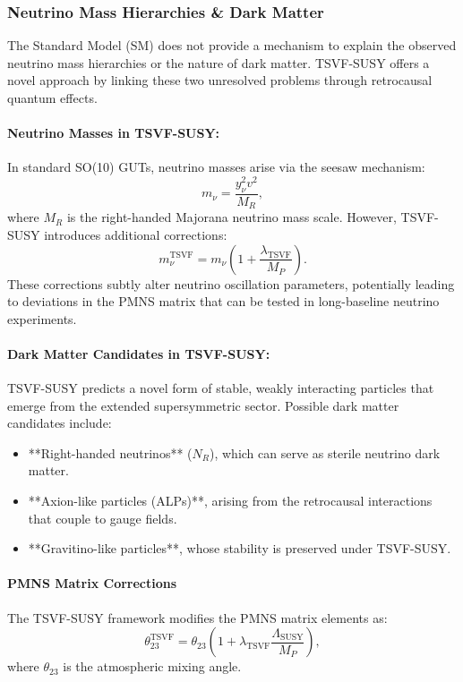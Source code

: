 \documentclass[twocolumn,superscriptaddress,floatfix]{revtex4-2}
\begin{document}
\subsubsection{Neutrino Mass Hierarchies \& Dark Matter}
\label{subsec:neutrino_darkmatter}

The Standard Model (SM) does not provide a mechanism to explain the observed neutrino mass hierarchies or the nature of dark matter. TSVF-SUSY offers a novel approach by linking these two unresolved problems through retrocausal quantum effects.

\paragraph{Neutrino Masses in TSVF-SUSY:}  
In standard SO(10) GUTs, neutrino masses arise via the seesaw mechanism:
\begin{equation}
m_{\nu} = \frac{y_{\nu}^2 v^2}{M_R},
\end{equation}
where $M_R$ is the right-handed Majorana neutrino mass scale. However, TSVF-SUSY introduces additional corrections:
\begin{equation}
m_{\nu}^{\text{TSVF}} = m_{\nu} \left(1 + \frac{\lambda_{\text{TSVF}}}{M_P} \right).
\label{eq:neutrino_mass_tsvf}
\end{equation}
These corrections subtly alter neutrino oscillation parameters, potentially leading to deviations in the PMNS matrix that can be tested in long-baseline neutrino experiments.

\paragraph{Dark Matter Candidates in TSVF-SUSY:}  
TSVF-SUSY predicts a novel form of stable, weakly interacting particles that emerge from the extended supersymmetric sector. Possible dark matter candidates include:
\begin{itemize}
    \item **Right-handed neutrinos** ($N_R$), which can serve as sterile neutrino dark matter.
    \item **Axion-like particles (ALPs)**, arising from the retrocausal interactions that couple to gauge fields.
    \item **Gravitino-like particles**, whose stability is preserved under TSVF-SUSY.
\end{itemize}

\paragraph{PMNS Matrix Corrections}
The TSVF-SUSY framework modifies the PMNS matrix elements as:
\begin{equation}
\theta_{23}^{\text{TSVF}} = \theta_{23} \left(1 + \lambda_{\text{TSVF}} \frac{\Lambda_{\text{SUSY}}}{M_P} \right),
\label{eq:pmns_correction}
\end{equation}
where $\theta_{23}$ is the atmospheric mixing angle.
\end{document}
